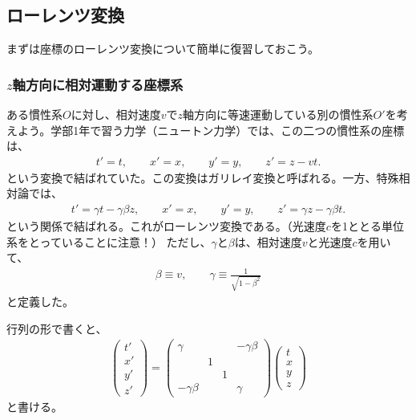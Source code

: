 \documentclass[10pt,a4paper]{jarticle}
\begin{document}
\subsection{ローレンツ変換}
まずは座標のローレンツ変換について簡単に復習しておこう。

\subsubsection{$z$軸方向に相対運動する座標系}
ある慣性系$O$に対し、相対速度$v$で$z$軸方向に等速運動している別の慣性系$O'$を考えよう。学部1年で習う力学（ニュートン力学）では、この二つの慣性系の座標は、
\begin{align}
t' = t, \qquad
x' = x, \qquad
y' = y, \qquad
z' = z - v t.
\end{align}
という変換で結ばれていた。この変換はガリレイ変換と呼ばれる。一方、特殊相対論では、
\begin{align}
t' = \gamma t - \gamma\beta z, \qquad
x' = x, \qquad
y' = y, \qquad
z' = \gamma z - \gamma\beta t.
\end{align}
という関係で結ばれる。これがローレンツ変換である。（光速度$c$を1ととる単位系をとっていることに注意！）
ただし、$\gamma$と$\beta$は、相対速度$v$と光速度$c$を用いて、
\begin{align}
\beta \equiv v, \qquad
\gamma \equiv \frac{1}{\sqrt{1-\beta^2}}
\end{align}
と定義した。

行列の形で書くと、
\begin{align}
\left(\begin{array}{c}
t' \\
x' \\
y' \\
z'
\end{array}\right)
%
=
%
\left(\begin{array}{cccc}
\gamma &&& -\gamma\beta\\
& 1 && \\
&& 1 & \\
-\gamma\beta &&& \gamma
\end{array}\right)
%
\left(\begin{array}{c}
t \\
x \\
y \\
z
\end{array}\right) \label{eq:lorentz z boost}
\end{align}
と書ける。
\end{document}
